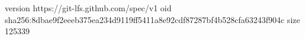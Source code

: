 version https://git-lfs.github.com/spec/v1
oid sha256:8dbae9f2eeeb375ea234d9119ff5411a8e92cdf87287bf4b528cfa63243f904c
size 125339
